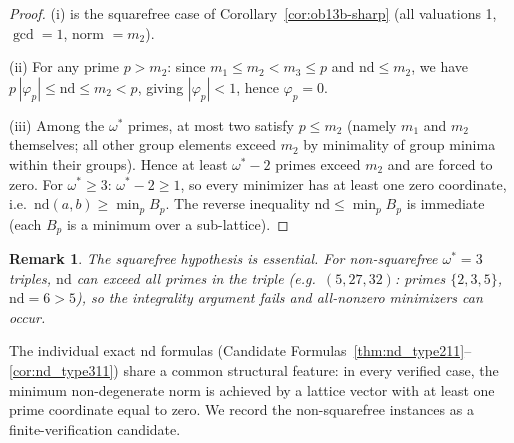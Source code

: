\documentclass[12pt]{article}
\newtheorem{remark}{Remark}
\theoremstyle{definition}
\begin{document}
\begin{proof}
  (i) is the squarefree case of Corollary~\ref{cor:ob13b-sharp} (all valuations 1,
  $\gcd=1$, norm $= m_2$).

  (ii) For any prime $p > m_2$: since $m_1 \le m_2 < m_3 \le p$ and
  $\mathrm{nd} \le m_2$, we have $p\,|\varphi_p| \le \mathrm{nd} \le m_2 < p$,
  giving $|\varphi_p| < 1$, hence $\varphi_p=0$.

  (iii) Among the $\omega^*$ primes, at most two satisfy $p \le m_2$ (namely
  $m_1$ and $m_2$ themselves; all other group elements exceed $m_2$ by
  minimality of group minima within their groups).  Hence at least
  $\omega^*-2$ primes exceed $m_2$ and are forced to zero.  For $\omega^*\ge 3$:
  $\omega^*-2\ge 1$, so every minimizer has at least one zero coordinate,
  i.e.\ $\mathrm{nd}(a,b)\ge\min_p B_p$.  The reverse inequality
  $\mathrm{nd}\le\min_p B_p$ is immediate (each $B_p$ is a minimum over a
  sub-lattice).
\end{proof}

\begin{remark}
  The squarefree hypothesis is essential.  For non-squarefree $\omega^*=3$
  triples, $\mathrm{nd}$ can exceed all primes in the triple (e.g.\ $(5,27,32)$:
  primes $\{2,3,5\}$, $\mathrm{nd}=6>5$), so the integrality argument fails
  and all-nonzero minimizers can occur.
\end{remark}

The individual exact nd formulas (Candidate Formulas~\ref{thm:nd_type211}--\ref{cor:nd_type311})
share a common structural feature: in every verified case, the minimum non-degenerate
norm is achieved by a lattice vector with at least one prime coordinate equal to zero.
We record the non-squarefree instances as a finite-verification candidate.
\end{document}
